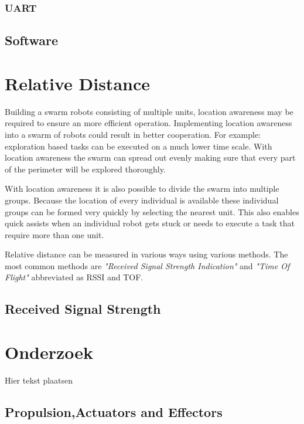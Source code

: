 \documentclass[10pt,a4paper]{article}
\begin{document}
\subsubsection{UART}
\subsection{Software}


\newpage

\section{Relative Distance}
Building a swarm robots consisting of multiple units, location awareness may be required to ensure an more efficient operation. Implementing location awareness into a swarm of robots could result in better cooperation. For example: exploration based tasks can be executed on a much lower time scale. With location awareness the swarm can spread out evenly making sure that every part of the perimeter will be explored thoroughly. 

With location awareness it is also possible to divide the swarm into multiple groups. Because the location of every individual is available these individual groups can be formed very quickly by selecting the nearest unit. This also enables quick assists when an individual robot gets stuck or needs to execute a task that require more than one unit.

Relative distance can be measured in various ways using various methods. The most common methods are \textit{"Received Signal Strength Indication"} and \textit{"Time Of Flight"} abbreviated as RSSI and TOF. 

\subsection{Received Signal Strength}

\newpage

\section{Onderzoek}
Hier tekst plaatsen

\subsection{Propulsion,Actuators and Effectors}
\end{document}
